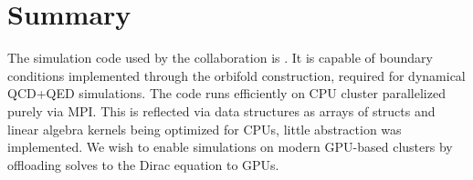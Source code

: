 
\section{Summary}
\label{sec:openqxd:summary}


The simulation code used by the \RCstar collaboration is \openqxd.
It is capable of \Cstar boundary conditions implemented through the orbifold construction, required for dynamical QCD+QED simulations.
The code runs efficiently on CPU cluster parallelized purely via MPI.
This is reflected via data structures as arrays of structs and linear algebra kernels being optimized for CPUs, little abstraction was implemented.
We wish to enable simulations on modern GPU-based clusters by offloading solves to the Dirac equation to GPUs.


